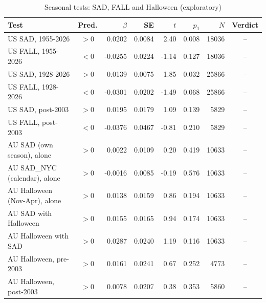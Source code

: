 \begin{table}[htbp]\centering\small
\caption{Seasonal tests: SAD, FALL and Halloween (exploratory)}
\begin{tabular}{lcrrrrrc}\toprule
Test & Pred. & $\beta$ & SE & $t$ & $p_{1}$ & $N$ & Verdict \\ \midrule
US SAD, 1955-2026 & $>$0 & 0.0202 & 0.0084 & 2.40 & 0.008 & 18036 & -- \\
US FALL, 1955-2026 & $<$0 & -0.0255 & 0.0224 & -1.14 & 0.127 & 18036 & -- \\
US SAD, 1928-2026 & $>$0 & 0.0139 & 0.0075 & 1.85 & 0.032 & 25866 & -- \\
US FALL, 1928-2026 & $<$0 & -0.0301 & 0.0202 & -1.49 & 0.068 & 25866 & -- \\
US SAD, post-2003 & $>$0 & 0.0195 & 0.0179 & 1.09 & 0.139 & 5829 & -- \\
US FALL, post-2003 & $<$0 & -0.0376 & 0.0467 & -0.81 & 0.210 & 5829 & -- \\
AU SAD (own season), alone & $>$0 & 0.0022 & 0.0109 & 0.20 & 0.419 & 10633 & -- \\
AU SAD_NYC (calendar), alone & $>$0 & -0.0016 & 0.0085 & -0.19 & 0.576 & 10633 & -- \\
AU Halloween (Nov-Apr), alone & $>$0 & 0.0138 & 0.0159 & 0.86 & 0.194 & 10633 & -- \\
AU SAD with Halloween & $>$0 & 0.0155 & 0.0165 & 0.94 & 0.174 & 10633 & -- \\
AU Halloween with SAD & $>$0 & 0.0287 & 0.0240 & 1.19 & 0.116 & 10633 & -- \\
AU Halloween, pre-2003 & $>$0 & 0.0161 & 0.0241 & 0.67 & 0.252 & 4773 & -- \\
AU Halloween, post-2003 & $>$0 & 0.0078 & 0.0207 & 0.38 & 0.353 & 5860 & -- \\
\bottomrule\end{tabular}\end{table}
